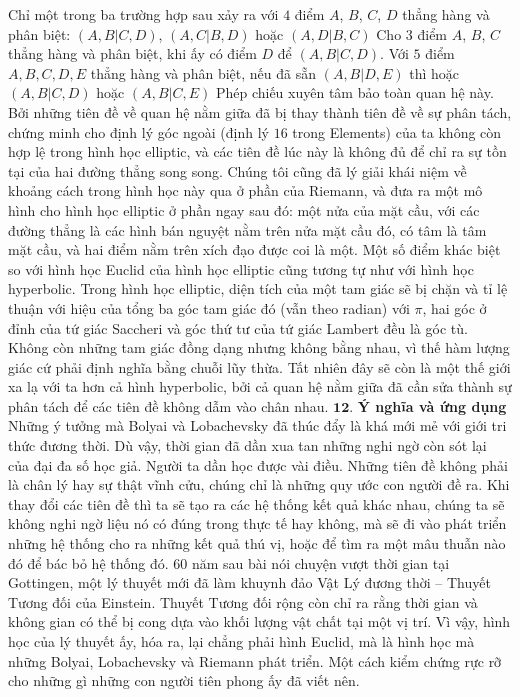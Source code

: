 \begin{multicols}{2}
	Chỉ một trong ba trường hợp sau xảy ra với $4$ điểm $A$, $B$, $C$, $D$ thẳng hàng và phân biệt: $(A, B | C, D)$, $(A, C | B, D)$ hoặc $(A, D | B, C)$
	\vskip 0.1cm
	Cho $3$ điểm $A$, $B$, $C$ thẳng hàng và phân biệt, khi ấy có điểm $D$ để $(A, B | C, D)$.
	\vskip 0.1cm
	Với $5$ điểm $A, B, C, D, E$ thẳng hàng và phân biệt, nếu đã sẵn $(A, B | D, E)$ thì hoặc $(A, B | C, D)$ hoặc $(A, B | C, E)$
	Phép chiếu xuyên tâm bảo toàn quan hệ này.
	\vskip 0.1cm
	Bởi những tiên đề về quan hệ nằm giữa đã bị thay thành tiên đề về sự phân tách, chứng minh cho định lý góc ngoài (định lý $16$ trong Elements) của ta không còn hợp lệ trong hình học elliptic, và các  tiên đề lúc này là không đủ để chỉ ra sự tồn tại của hai đường thẳng song song. 
	\vskip 0.1cm
	Chúng tôi cũng đã lý giải khái niệm về khoảng cách trong hình học này qua ở phần của Riemann, và đưa ra một mô hình cho hình học elliptic ở phần ngay sau đó: một nửa của mặt cầu, với các đường thẳng là các hình bán nguyệt nằm trên nửa mặt cầu đó, có tâm là tâm mặt cầu, và hai điểm nằm trên xích đạo được coi là một. 
	\vskip 0.1cm
	Một số điểm khác biệt so với hình học Euclid của hình học elliptic cũng tương tự như với hình học hyperbolic. Trong hình học elliptic, diện tích của một tam giác sẽ bị chặn và tỉ lệ thuận với hiệu của tổng ba góc tam giác đó (vẫn theo radian) với $\pi$, hai góc ở đỉnh của tứ giác Saccheri và góc thứ tư của tứ giác Lambert đều là góc tù. Không còn những tam giác đồng dạng nhưng không bằng nhau, vì thế hàm lượng giác cứ phải định nghĩa bằng chuỗi lũy thừa. Tất nhiên đây sẽ còn là một thế giới xa lạ với ta hơn cả hình hyperbolic, bởi cả quan hệ nằm giữa đã cần sửa thành sự phân tách để các tiên đề không dẫm vào chân nhau. 
	\vskip 0.1cm
	$\pmb{12.}$ \textbf{\color{lichsutoanhoc}Ý nghĩa và ứng dụng}
	\vskip 0.1cm
	Những ý tưởng mà Bolyai và Lobachevsky đã thúc đẩy là khá mới mẻ với giới tri thức đương thời. Dù vậy, thời gian đã dần xua tan những nghi ngờ còn sót lại của đại đa số học giả. Người ta dần học được vài điều. Những tiên đề không phải là chân lý hay sự thật vĩnh cửu, chúng chỉ là những quy ước con người đề ra. Khi thay đổi các tiên đề thì ta sẽ tạo ra các hệ thống kết quả khác nhau, chúng ta sẽ không nghi ngờ liệu nó có đúng trong thực tế hay không, mà sẽ đi vào phát triển những hệ thống cho ra những kết quả thú vị, hoặc để tìm ra một mâu thuẫn nào đó để bác bỏ hệ thống đó.
	\vskip 0.1cm
	$60$ năm sau bài nói chuyện vượt thời gian tại Gottingen, một lý thuyết mới đã làm khuynh đảo Vật Lý đương thời -- Thuyết Tương đối của Einstein. Thuyết Tương đối rộng còn chỉ ra rằng thời gian và không gian có thể bị cong dựa vào khối lượng vật chất tại một vị trí. Vì vậy, hình học của lý thuyết ấy, hóa ra, lại chẳng phải hình Euclid, mà là hình học mà những Bolyai, Lobachevsky và Riemann phát triển. Một cách kiểm chứng rực rỡ cho những gì những con người tiên phong ấy đã viết nên.

\end{multicols}
